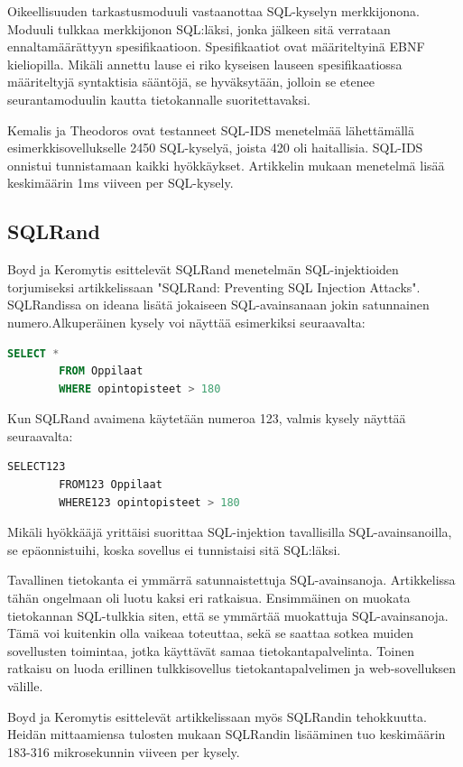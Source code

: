 \documentclass[finnish]{tktltiki2}
\theoremstyle{definition}
\theoremstyle{remark}
\begin{document}
	Oikeellisuuden tarkastusmoduuli vastaanottaa SQL-kyselyn merkkijonona. Moduuli tulkkaa merkkijonon SQL:läksi, jonka jälkeen sitä verrataan ennaltamäärättyyn spesifikaatioon. Spesifikaatiot ovat määriteltyinä EBNF kieliopilla. Mikäli annettu lause ei riko kyseisen lauseen spesifikaatiossa määriteltyjä syntaktisia sääntöjä, se hyväksytään, jolloin se etenee seurantamoduulin kautta tietokannalle suoritettavaksi.

	Kemalis ja Theodoros ovat testanneet SQL-IDS menetelmää lähettämällä esimerkkisovellukselle 2450 SQL-kyselyä, joista 420 oli haitallisia. SQL-IDS onnistui tunnistamaan kaikki hyökkäykset. Artikkelin mukaan menetelmä lisää keskimäärin 1ms viiveen per SQL-kysely.
					

		
	\subsection{SQLRand}
	Boyd ja Keromytis esittelevät SQLRand menetelmän SQL-injektioiden torjumiseksi artikkelissaan "SQLRand: Preventing SQL Injection Attacks"\space \cite{sqlrand}. SQLRandissa on ideana lisätä jokaiseen SQL-avainsanaan jokin satunnainen numero.Alkuperäinen kysely voi näyttää esimerkiksi seuraavalta:
		\begin{lstlisting}[language=sql]
		SELECT * 
		FROM Oppilaat
		WHERE opintopisteet > 180
		\end{lstlisting}
		Kun SQLRand avaimena käytetään numeroa 123, valmis kysely näyttää seuraavalta: 
		\begin{lstlisting}[language=sql]
		SELECT123
		FROM123 Oppilaat
		WHERE123 opintopisteet > 180
		\end{lstlisting}
		
	
	
	Mikäli hyökkääjä yrittäisi suorittaa SQL-injektion tavallisilla SQL-avainsanoilla, se epäonnistuihi, koska sovellus ei tunnistaisi sitä SQL:läksi.
	

	Tavallinen tietokanta ei ymmärrä satunnaistettuja SQL-avainsanoja. Artikkelissa tähän ongelmaan oli luotu kaksi eri ratkaisua. Ensimmäinen on muokata tietokannan SQL-tulkkia siten, että se ymmärtää muokattuja SQL-avainsanoja. Tämä voi kuitenkin olla vaikeaa toteuttaa, sekä se saattaa sotkea muiden sovellusten toimintaa, jotka käyttävät samaa tietokantapalvelinta. Toinen ratkaisu on luoda erillinen tulkkisovellus tietokantapalvelimen ja web-sovelluksen välille.
	
	Boyd ja Keromytis esittelevät artikkelissaan myös SQLRandin tehokkuutta. Heidän mittaamiensa tulosten mukaan SQLRandin lisääminen tuo keskimäärin 183-316 mikrosekunnin viiveen per kysely.
	
\end{document}
